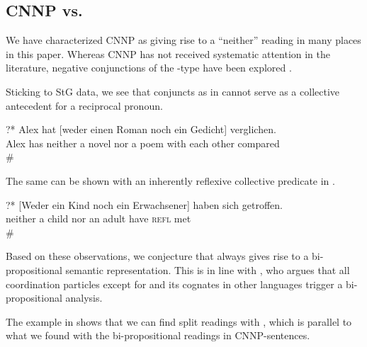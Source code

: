 \documentclass[output=paper]{langsci/langscibook}
\begin{document}
\subsection{CNNP vs.\@ {}}
\label{Sec-NeitherNor}


We have characterized CNNP as giving rise to a ``neither'' reading in many places in this paper.
Whereas CNNP has not received systematic attention in the literature, negative conjunctions of the -type have been explored \citep{deSwart:01ni,Doetjes:05,Gajic:16}.%

Sticking to StG data, we see that  conjuncts as in  cannot serve as a collective antecedent for a reciprocal pronoun.

\ea \label{weder-reci}
\gll ?* Alex hat [weder einen Roman noch ein Gedicht]  verglichen.\\
{} Alex has \hphantom{[}neither a novel nor a poem {with each other} compared\\
\glt \# 
\z 

The same can be shown with an inherently reflexive collective predicate 
in .

\ea \label{weder-treffen}
\gll ?* [Weder ein Kind noch ein Erwachsener] haben sich getroffen.\\
{} \hphantom{[}neither a child nor an adult have \textsc{refl} met\\
\glt \# 
\z 

Based on these observations, we conjecture that  always gives rise to a bi-propositional semantic representation. 
This is in line with \cite[33]{Winter:01}, who argues that all coordination  particles except for  and its cognates in other languages trigger a bi-propositional analysis.

The example in  shows that we can find split readings with , which is parallel
to what we found with the bi-propositional readings in CNNP-sentences.
\end{document}
